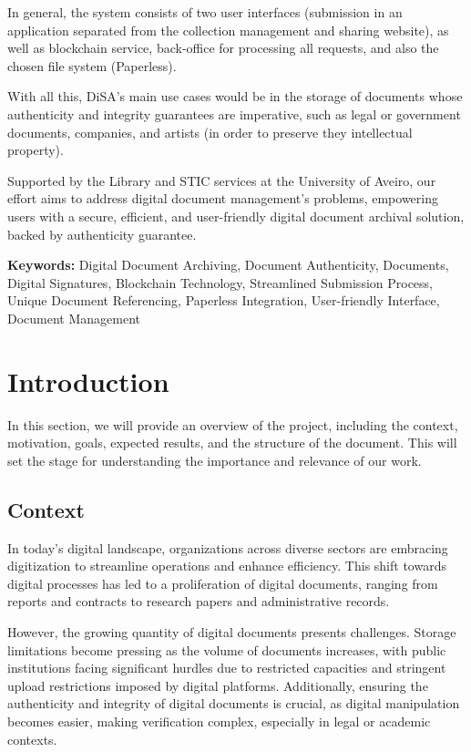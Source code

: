\documentclass[a4paper,11pt]{article}
\begin{document}
        In general, the system consists of two user interfaces (submission in an application separated from the collection management and sharing website), as well as blockchain service, back-office for processing all requests, and also the chosen file system (Paperless).

        With all this, DiSA's main use cases would be in the storage of documents whose authenticity and integrity guarantees are imperative, such as legal or government documents, companies, and artists (in order to preserve they intellectual property).

        Supported by the Library and STIC services at the University of Aveiro, our effort aims to address digital document management's problems, empowering users with a secure, efficient, and user-friendly digital document archival solution, backed by authenticity guarantee.

        \vspace{0.5cm}
        \textbf{Keywords:} Digital Document Archiving, Document Authenticity, Documents, Digital Signatures, Blockchain Technology, Streamlined Submission Process, Unique Document Referencing, Paperless Integration, User-friendly Interface, Document Management

    \clearpage
    \section{Introduction}\label{sec:intro}
        \quad In this section, we will provide an overview of the project, including the context, motivation, goals, expected results, and the structure of the document. This will set the stage for understanding the importance and relevance of our work.
    
        \subsection{Context}
            \quad In today's digital landscape, organizations across diverse sectors are embracing digitization to streamline operations and enhance efficiency. This shift towards digital processes has led to a proliferation of digital documents, ranging from reports and contracts to research papers and administrative records.
            
            However, the growing quantity of digital documents presents challenges. Storage limitations become pressing as the volume of documents increases, with public institutions facing significant hurdles due to restricted capacities and stringent upload restrictions imposed by digital platforms. Additionally, ensuring the authenticity and integrity of digital documents is crucial, as digital manipulation becomes easier, making verification complex, especially in legal or academic contexts.
            
\end{document}
